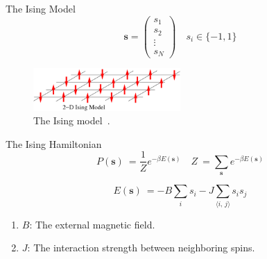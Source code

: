 \documentclass{beamer}
\newcommand{\bolds}[1]{\boldsymbol{#1}}
\newcommand{\bs}{\bolds{s}}
\renewcommand{\b}{\beta}
\begin{document}
\begin{frame}{The Ising Model}
  \begin{equation*}%
    \bs =       \begin{pmatrix}
      s_1\\
      s_2\\
      \vdots\\
      s_N
    \end{pmatrix}\quad s_i\in\{-1,1\}
  \end{equation*}%

  \begin{figure}[ht]
    \centering
    \includegraphics[width=0.5\textwidth]{figures/ising.png}
    \caption{The Ising model~\cite{ising}.\label{fig:ising} }
  \end{figure}

\end{frame}


\begin{frame}{The Ising Hamiltonian}
  \begin{equation*}%
    \boxed{P(\bs)\:=\frac{1}{Z}e^{-\b E(\bs)}\quad Z\:=\sum_{\bs} e^{-\b E(\bs)}}\label{eq:boltzmann-distribution}
  \end{equation*}%

  \begin{equation*}
    \boxed{E(\bs)\:= -B \sum_i s_i-J \sum_{\langle i,\, j\rangle} s_i s_j}
    \label{eq:ising-energy}
  \end{equation*}%

  \begin{enumerate}
  \item $B$: The external magnetic field.
  \item $J$: The interaction strength between neighboring spins.
  \end{enumerate}
\end{frame}
\end{document}
